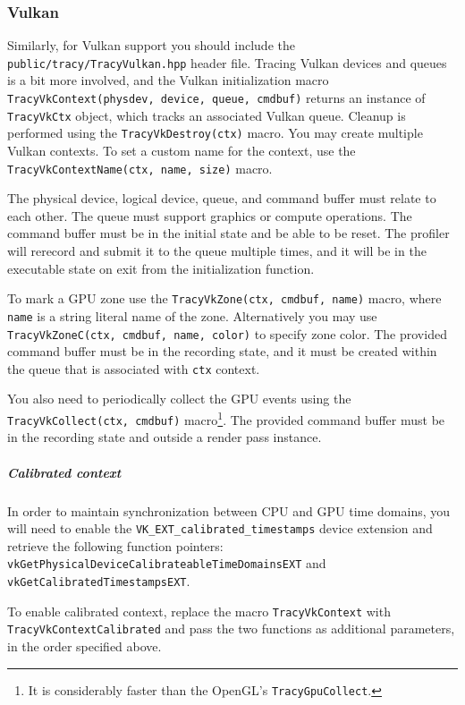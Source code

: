 \documentclass[hidelinks,titlepage,a4paper,twoside]{article}
\begin{document}
\subsubsection{Vulkan}

Similarly, for Vulkan support you should include the \texttt{public/tracy/TracyVulkan.hpp} header file. Tracing Vulkan devices and queues is a bit more involved, and the Vulkan initialization macro \texttt{TracyVkContext(physdev, device, queue, cmdbuf)} returns an instance of \texttt{TracyVkCtx} object, which tracks an associated Vulkan queue. Cleanup is performed using the \texttt{TracyVkDestroy(ctx)} macro. You may create multiple Vulkan contexts. To set a custom name for the context, use the \texttt{TracyVkContextName(ctx, name, size)} macro.

The physical device, logical device, queue, and command buffer must relate to each other. The queue must support graphics or compute operations. The command buffer must be in the initial state and be able to be reset. The profiler will rerecord and submit it to the queue multiple times, and it will be in the executable state on exit from the initialization function.

To mark a GPU zone use the \texttt{TracyVkZone(ctx, cmdbuf, name)} macro, where \texttt{name} is a string literal name of the zone. Alternatively you may use \texttt{TracyVkZoneC(ctx, cmdbuf, name, color)} to specify zone color. The provided command buffer must be in the recording state, and it must be created within the queue that is associated with \texttt{ctx} context.

You also need to periodically collect the GPU events using the \texttt{TracyVkCollect(ctx, cmdbuf)} macro\footnote{It is considerably faster than the OpenGL's \texttt{TracyGpuCollect}.}. The provided command buffer must be in the recording state and outside a render pass instance.

\subparagraph{Calibrated context}

In order to maintain synchronization between CPU and GPU time domains, you will need to enable the \texttt{VK\_EXT\_calibrated\_timestamps} device extension and retrieve the following function pointers: \texttt{vkGetPhysicalDeviceCalibrateableTimeDomainsEXT} and \texttt{vkGetCalibratedTimestampsEXT}.

To enable calibrated context, replace the macro \texttt{TracyVkContext} with \texttt{TracyVkContextCalibrated} and pass the two functions as additional parameters, in the order specified above.
\end{document}
